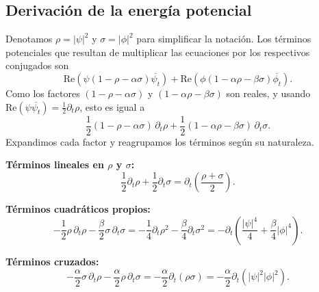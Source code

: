 \documentclass[letterpaper,11pt]{exam}
\theoremstyle{plain}
\begin{document}
\subsection*{Derivación de la energía potencial}

Denotamos $\rho = |\psi|^2$ y $\sigma = |\phi|^2$ para simplificar la notación.
Los términos potenciales que resultan de multiplicar las ecuaciones por los respectivos conjugados son
\begin{equation}
    \mathrm{Re}\!\left(\psi(1-\rho-\alpha\sigma)\overline{\psi_t}\right)
    + \mathrm{Re}\!\left(\phi(1-\alpha\rho-\beta\sigma)\overline{\phi_t}\right).
\end{equation}
Como los factores $(1-\rho-\alpha\sigma)$ y $(1-\alpha\rho-\beta\sigma)$ son reales, y usando
$\mathrm{Re}(\psi\overline{\psi_t}) = \frac{1}{2}\partial_t\rho$, esto es igual a
\begin{equation}
    \frac{1}{2}(1-\rho-\alpha\sigma)\,\partial_t\rho
    + \frac{1}{2}(1-\alpha\rho-\beta\sigma)\,\partial_t\sigma.
\end{equation}
Expandimos cada factor y reagrupamos los términos según su naturaleza.

\medskip
\noindent\textbf{Términos lineales en $\rho$ y $\sigma$:}
\begin{equation}
    \frac{1}{2}\partial_t\rho + \frac{1}{2}\partial_t\sigma
    = \partial_t\!\left(\frac{\rho + \sigma}{2}\right).
\end{equation}

\noindent\textbf{Términos cuadráticos propios:}
\begin{equation}
    -\frac{1}{2}\rho\,\partial_t\rho - \frac{\beta}{2}\sigma\,\partial_t\sigma
    = -\frac{1}{4}\partial_t\rho^2 - \frac{\beta}{4}\partial_t\sigma^2
    = -\partial_t\!\left(\frac{|\psi|^4}{4} + \frac{\beta}{4}|\phi|^4\right).
\end{equation}

\noindent\textbf{Términos cruzados:}
\begin{equation}
    -\frac{\alpha}{2}\sigma\,\partial_t\rho - \frac{\alpha}{2}\rho\,\partial_t\sigma
    = -\frac{\alpha}{2}\partial_t(\rho\sigma)
    = -\frac{\alpha}{2}\partial_t(|\psi|^2|\phi|^2).
\end{equation}
\end{document}
